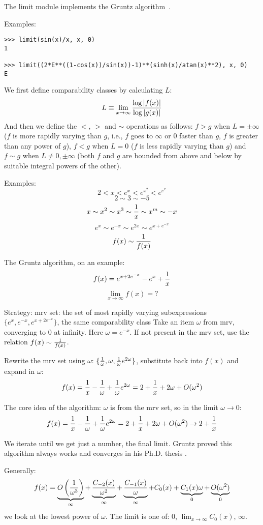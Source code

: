 The limit module implements the Gruntz algorithm~\cite{Gruntz1996limits}.

Examples:
\begin{verbatim}
>>> limit(sin(x)/x, x, 0)
1

>>> limit((2*E**((1-cos(x))/sin(x))-1)**(sinh(x)/atan(x)**2), x, 0)
E
\end{verbatim}

We first define comparability classes by calculating $L$:
\begin{equation}
L\equiv \lim_{x\to\infty} {\log |f(x)| \over \log |g(x)|}
\end{equation}
And then we define the $<$, $>$ and $\sim$ operations as follows: $f>g$ when
$L=\pm\infty$ ($f$ is more rapidly varying than $g$, i.e., $f$ goes to $\infty$
or $0$ faster than $g$, $f$ is greater than any power of $g$), $f<g$ when $L=0$
($f$ is less rapidly varying than $g$) and $f\sim g$ when $L\neq 0,\pm\infty$
(both $f$ and $g$ are bounded from above and below by suitable integral powers
of the other).

Examples:
$$2 < x < e^x < e^{x^2} < e^{e^x}$$
$$2\sim 3\sim -5$$
$$x\sim x^2\sim x^3\sim {1\over x}\sim x^m\sim -x$$
$$e^x\sim e^{-x}\sim e^{2x}\sim e^{x+e^{-x}}$$
$$f(x)\sim{1\over f(x)}$$

The Gruntz algorithm, on an example:
$$f(x) = e^{x+2e^{-x}} - e^x + {1\over x}$$
$$\lim_{x\to\infty} f(x) = ?$$

Strategy:
mrv set: the set of most rapidly varying subexpressions
$\{e^x, e^{-x}, e^{x+2e^{-x}}\}$, the same comparability class
Take an item $\omega$ from mrv, converging to 0 at infinity. Here
$\omega=e^{-x}$. If not present in the mrv set, use the relation
$f(x)\sim {1\over f(x)}$.

Rewrite the mrv set using $\omega$: $\{{1\over\omega}, \omega,
{1\over\omega}e^{2\omega}\}$, substitute back into $f(x)$ and expand in
$\omega$:
$$f(x) = {1\over x}-{1\over\omega}+{1\over\omega}e^{2\omega}
    = 2+{1\over x} + 2\omega + O(\omega^2)$$

The core idea of the algorithm: $\omega$ is from the mrv set, so in the limit
$\omega\to0$:
$$f(x) = {1\over x}-{1\over\omega}+{1\over\omega}e^{2\omega}
    = 2+{1\over x} + 2\omega + O(\omega^2)
    \to 2 + {1\over x}$$

We iterate until we get just a number, the final limit. Gruntz proved this
algorithm always works and converges in his Ph.D. thesis
\cite{Gruntz1996limits}.

Generally:
$$ f(x) = \underbrace{O\left({1\over \omega^3}\right)}_\infty
    + \underbrace{C_{-2}(x)\over \omega^2}_\infty
    + \underbrace{C_{-1}(x)\over \omega}_\infty
    + {C_{0}(x)}
    + \underbrace{C_{1}(x)\omega}_0
    + \underbrace{O(\omega^2)}_0
$$
we look at the lowest power of $\omega$. The limit is one of: $0$,
$\lim_{x\to\infty} C_0(x)$, $\infty$.

